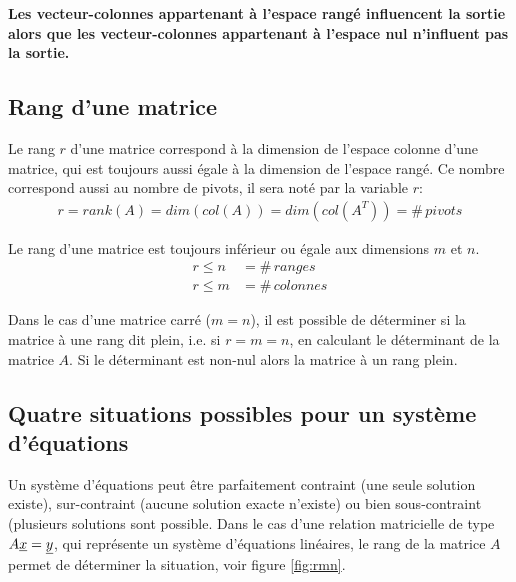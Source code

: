 \textbf{Les vecteur-colonnes appartenant à l'espace rangé influencent la sortie alors que les vecteur-colonnes appartenant à l'espace nul n'influent pas la sortie.} 






\subsection{Rang d'une matrice}
\label{sec:rang}

Le rang $r$ d'une matrice correspond à la dimension de l'espace colonne d'une matrice, qui est toujours aussi égale à la dimension de l'espace rangé. Ce nombre correspond aussi au nombre de pivots, il sera noté par la variable $r$:
\begin{align}
r = rank( A ) = dim( col(A) ) = dim( col(A^T) ) =\#\, pivots
\end{align}

Le rang d'une matrice est toujours inférieur ou égale aux dimensions $m$ et $n$.
\begin{align}
r \leq n &= \#\, ranges \\
r \leq m &= \#\, colonnes
\end{align}

Dans le cas d'une matrice carré ($m=n$), il est possible de déterminer si la matrice à une rang dit plein, i.e. si $r=m=n$, en calculant le déterminant de la matrice $A$. Si le déterminant est non-nul alors la matrice à un rang plein.  


\newpage
\subsection{Quatre situations possibles pour un système d'équations}
\label{sec:rangpleinvstrop}

Un système d'équations peut être parfaitement contraint (une seule solution existe), sur-contraint (aucune solution exacte n'existe) ou bien sous-contraint (plusieurs solutions sont possible. Dans le cas d'une relation matricielle de type $A \underline{x} = \underline{y} $, qui représente un système d’équations linéaires, le rang de la matrice $A$ permet de déterminer la situation, voir figure \ref{fig:rmn}.

